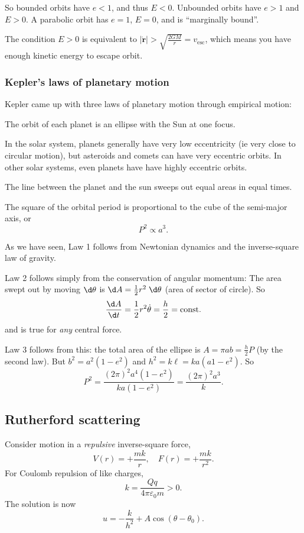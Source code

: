 \documentclass[a4paper]{article}
\begin{document}
So bounded orbits have $e < 1$, and thus $E < 0$. Unbounded orbits have $e > 1$ and $E > 0$. A parabolic orbit has $e = 1$, $E = 0$, and is ``marginally bound''.

The condition $E > 0$ is equivalent to $|\dot{\mathbf{r}}| > \sqrt{\frac{2GM}{r}} = v_{\mathrm{esc}}$, which means you have enough kinetic energy to escape orbit.

\subsubsection{Kepler's laws of planetary motion}
Kepler came up with three laws of planetary motion through empirical motion:
\begin{law}
  The orbit of each planet is an ellipse with the Sun at one focus.
\end{law}
\note In the solar system, planets generally have very low eccentricity (ie very close to circular motion), but asteroids and comets can have very eccentric orbits. In other solar systems, even planets have have highly eccentric orbits.

\begin{law}
  The line between the planet and the sun sweeps out equal areas in equal times.
\end{law}

\begin{law}
  The square of the orbital period is proportional to the cube of the semi-major axis, or
  \[
    P^2 \propto a^3.
  \]
\end{law}

As we have seen, Law 1 follows from Newtonian dynamics and the inverse-square law of gravity.

Law 2 follows simply from the conservation of angular momentum: The area swept out by moving $\d \theta$ is $\d A = \frac{1}{2}r^2\;\d \theta$ (area of sector of circle). So
\[
  \frac{\d A}{\d t} = \frac{1}{2}r^2\dot{\theta} = \frac{h}{2} = \text{const}.
\]
and is true for \emph{any} central force.

Law 3 follows from this: the total area of the ellipse is $A = \pi ab = \frac{h}{2}P$ (by the second law). But $b^2 = a^2( 1 - e^2)$ and $h^2 = k\ell = ka(a1 - e^2)$. So
\[
  P^2 = \frac{(2\pi)^2a^4(1 - e^2)}{ka(1 - e^2)} = \frac{(2\pi)^2 a^3}{k}.
\]

\subsection{Rutherford scattering}
Consider motion in a \emph{repulsive} inverse-square force,
\[
  V(r) = +\frac{mk}{r}, \quad F(r) = +\frac{mk}{r^2}.
\]
For Coulomb repulsion of like charges,
\[
  k = \frac{Qq}{4\pi \varepsilon_0 m} > 0.
\]
The solution is now
\[
  u = -\frac{k}{h^2} + A\cos (\theta - \theta_0).
\]
\end{document}
